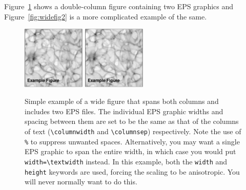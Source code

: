 \documentclass[preprint]{rmxac}
\newcommand{\CS}[1]{\texttt{\textbackslash #1}}
\begin{document}
Figure~\ref{fig:widefig1} shows a double-column figure containing two
EPS graphics and Figure~\ref{fig:widefig2} is a more complicated
example of the same. 

\begin{figure}[!t]
  \includegraphics[width=\columnwidth,height=3cm]{example-fig}%
  \hspace*{\columnsep}%
  \includegraphics[width=\columnwidth,height=3cm]{example-fig}
  \caption{Simple example of a wide figure that spans both
    columns and includes two EPS files. The individual EPS graphic
    widths and spacing between them are set to be the same as that of
    the columns of text (\CS{columnwidth} and \CS{columnsep})
    respectively. Note the use of \texttt{\%} to suppress unwanted
    spaces. Alternatively, you may want a single EPS graphic to span
    the entire width, in which case you would put
    \texttt{width=\CS{textwidth}} instead. In this example, both the
    \texttt{width} and \texttt{height} keywords are used, forcing the
    scaling to be anisotropic. You will never normally want to do
    this.}
  \label{fig:widefig1}
\end{figure}
\end{document}
